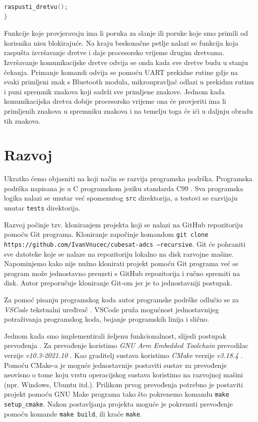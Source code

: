 \documentclass[times, utf8, diplomski, numeric]{templates/template}
\begin{document}
{{{{\begin{lstlisting}[language=C]
    raspusti_dretvu();
}           \end{lstlisting}

                Funkcije koje provjeravaju ima li poruka za slanje ili poruke koje smo primili od korisnika nisu blokirajuće. Na kraju beskonačne petlje nalazi se funkcija koja raspušta izvršavanje dretve i daje procesorsko vrijeme drugim dretvama. Izvršavanje komunikacijske dretve odvija se onda kada sve dretve budu u stanju čekanja. Primanje komandi odvija se pomoću UART prekidne rutine gdje na svaki primljeni znak s Bluetooth modula, mikroupravljač odlazi u prekidnu rutinu i puni spremnik znakova koji sadrži sve primljene znakove. Jednom kada komunikacijska dretva dobije procesorsko vrijeme ona će provjeriti ima li primljenih znakova u spremniku znakova i na temelju toga će ići u daljnju obradu tih znakova. 

            }
        }
    }

    \section{Razvoj}{
        Ukratko ćemo objasniti na koji način se razvija programska podrška. Programska podrška napisana je u C programskom jeziku standarda C99 \cite{c99}. Sva programska logika nalazi se unutar već spomenutog \texttt{src} direktorija, a testovi se razvijaju unutar \texttt{tests} direktorija. 
        
        Razvoj počinje tzv. kloniranjem projekta koji se nalazi na GitHub repozitoriju \cite{github_repo} pomoću Git programa. Kloniranje započinje komandom \texttt{git clone https://github.com/IvanVnucec/cubesat-adcs --recursive}. Git će pohraniti sve datoteke koje se nalaze na repozitoriju lokalno na disk razvojne mašine. Napominjemo kako nije nužno klonirati projekt pomoću Git programa već se program može jednostavno preuzeti s GitHub repozitorija i ručno spremiti na disk. Autor preporučuje kloniranje Git-om jer je to jednostavniji postupak.  

        Za pomoć pisanju programskog koda autor programske podrške odlučio se za \emph{VSCode} tekstualni uređivač \cite{vscode}. VSCode pruža mogućnost jednostavnijeg potraživanja programskog koda, bojanje programskih linija i slično.
        
        Jednom kada smo implementirali željenu funkcionalnost, slijedi postupak prevođenja . Za prevođenje koristimo \emph{GNU Arm Embedded Toolchain} prevodilac  verzije \emph{v10.3-2021.10} \cite{gnu_arm_toolchain}. Kao graditelj sustava  koristimo \emph{CMake} verzije \emph{v3.18.4} \cite{cmake}. Pomoću CMake-a je moguće jednostavnije postaviti sustav za prevođenje neovisno o tome koju vrstu operacijskog sustava koristimo na razvojnoj mašini (npr. Windows, Ubuntu itd.). Prilikom prvog prevođenja potrebno je postaviti projekt pomoću GNU Make programa tako što pokrenemo komandu \texttt{make setup\_cmake}. Nakon postavljanja projekta moguće je pokrenuti prevođenje pomoću komande \texttt{make build}, ili kraće \texttt{make}. 

}}
\end{document}
